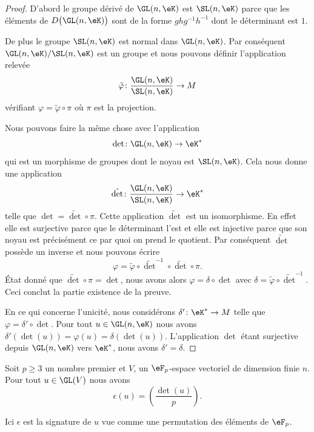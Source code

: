 \begin{proof}
    D'abord le groupe dérivé de \( \GL(n,\eK)\) est \( \SL(n,\eK)\) parce que les éléments de \( D\big( \GL(n,\eK) \big)\) sont de la forme \( ghg^{-1}h^{-1}\) dont le déterminant est \( 1\).

    De plus le groupe \( \SL(n,\eK)\) est normal dans \( \GL(n,\eK)\). Par conséquent \( \GL(n,\eK)/\SL(n,\eK)\) est un groupe et nous pouvons définir l'application relevée
    \begin{equation}
        \tilde \varphi\colon \frac{ \GL(n,\eK) }{ \SL(n,\eK) }\to M
    \end{equation}
    vérifiant \( \varphi=\tilde \varphi\circ\pi\) où \( \pi\) est la projection.

    Nous pouvons faire la même chose avec l'application
    \begin{equation}
        \det\colon \GL(n,\eK)\to \eK^*
    \end{equation}
    qui est un morphisme de groupes dont le noyau est \( \SL(n,\eK)\). Cela nous donne une application
    \begin{equation}
        \tilde \det\colon \frac{ \GL(n,\eK) }{ \SL(n,\eK) }\to \eK^*
    \end{equation}
    telle que \( \det=\tilde \det\circ\pi\). Cette application \( \tilde \det\) est un isomorphisme. En effet elle est surjective parce que le déterminant l'est et elle est injective parce que son noyau est précisément ce par quoi on prend le quotient. Par conséquent \( \tilde \det \) possède un inverse et nous pouvons écrire
    \begin{equation}
        \varphi=\tilde \varphi\circ\tilde \det^{-1}\circ\tilde \det\circ\pi.
    \end{equation}
    État donné que \( \tilde \det\circ\pi=\det\), nous avons alors \( \varphi=\delta\circ\det\) avec \( \delta=\tilde \varphi\circ\tilde \det^{-1}\). Ceci conclut la partie existence de la preuve.

    En ce qui concerne l'unicité, nous considérons \( \delta'\colon \eK^*\to M\) telle que \( \varphi=\delta'\circ\det\). Pour tout \( u\in \GL(n,\eK)\) nous avons \( \delta'(\det(u))=\varphi(u)=\delta(\det(u))\). L'application \( \det\) étant surjective depuis \( \GL(n,\eK)\) vers \( \eK^*\), nous avons \( \delta'=\delta\).
\end{proof}

\begin{theorem}
    Soit \( p\geq 3\) un nombre premier et \( V\), un \( \eF_p\)-espace vectoriel de dimension finie \( n\). Pour tout \( u\in\GL(V)\) nous avons
    \begin{equation}
        \epsilon(u)=\left(\frac{\det(u)}{p}\right).
    \end{equation}
\end{theorem}
Ici \( \epsilon\) est la signature de \( u \) vue comme une permutation des éléments de \( \eF_p\).

